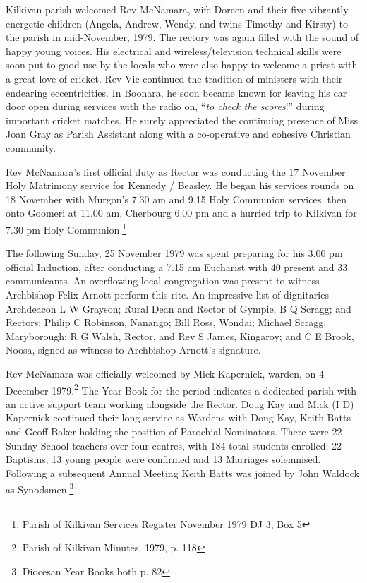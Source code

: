 Kilkivan parish welcomed Rev McNamara, wife Doreen and their five vibrantly energetic children (Angela, Andrew, Wendy, and twins Timothy and Kirsty) to the parish in mid-November, 1979. The rectory was again filled with the sound of happy young voices. His electrical and wireless/television technical skills were soon put to good use by the locals who were also happy to welcome a priest with a great love of cricket. Rev Vic continued the tradition of ministers with their endearing eccentricities. In Boonara, he soon became known for leaving his car door open during services with the radio on, ``\emph{to check the scores}!'' during important cricket matches. He surely appreciated the continuing presence of Miss Joan Gray as Parish Assistant along with a co-operative and cohesive Christian community.



Rev McNamara's first official duty as Rector was conducting the 17 November Holy Matrimony service for Kennedy / Beasley. He began his services rounds on 18 November with Murgon's 7.30 am and 9.15 Holy Communion services, then onto Goomeri at 11.00 am, Cherbourg 6.00 pm and a hurried trip to Kilkivan for 7.30 pm Holy Communion.\footnote{Parish of Kilkivan Services Register November 1979 DJ 3, Box 5}


The following Sunday, 25 November 1979 was spent preparing for his 3.00 pm official Induction, after conducting a 7.15 am Eucharist with 40 present and 33 communicants. An overflowing local congregation was present to witness Archbishop Felix Arnott perform this rite. An impressive list of dignitaries - Archdeacon L W Grayson; Rural Dean and Rector of Gympie, B Q Scragg; and Rectors: Philip C Robinson, Nanango; Bill Ross, Wondai; Michael Scragg, Maryborough; R G Walsh, Rector, and Rev S James, Kingaroy; and C E Brook, Noosa, signed as witness to Archbishop Arnott's signature.



Rev McNamara was officially welcomed by Mick Kapernick, warden, on 4 December 1979.\footnote{Parish of Kilkivan Minutes, 1979, p. 118} The Year Book for the period indicates a dedicated parish with an active support team working alongside the Rector. Doug Kay and Mick (I D) Kapernick continued their long service as Wardens with Doug Kay, Keith Batts and Geoff Baker holding the position of Parochial Nominators. There were 22 Sunday School teachers over four centres, with 184 total students enrolled; 22 Baptisms; 13 young people were confirmed and 13 Marriages solemnised. Following a subsequent Annual Meeting Keith Batts was joined by John Waldock as Synodsmen.\footnote{Diocesan Year Books both p. 82}


